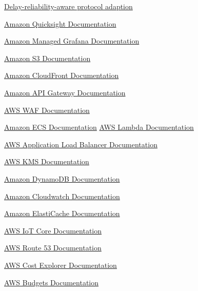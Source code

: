 \documentclass{article}
\begin{document}
\begin{thebibliography}{9}

 \href{https://journals.sagepub.com/doi/10.1177/15501329221097815#}{Delay-reliability-aware protocol adaption}

 \href{https://docs.aws.amazon.com/quicksight//}{Amazon Quicksight Documentation}

\href{https://docs.aws.amazon.com/grafana/}{Amazon Managed Grafana Documentation}

\href{https://docs.aws.amazon.com/s3/}{Amazon S3 Documentation}

 \href{https://docs.aws.amazon.com/cloudfront/}{Amazon CloudFront Documentation}

 \href{https://docs.aws.amazon.com/apigateway/}{Amazon API Gateway Documentation}

\href{https://docs.aws.amazon.com/waf/}{AWS WAF Documentation}

\href{https://docs.aws.amazon.com/ecs/}{Amazon ECS Documentation}
 \href{https://docs.aws.amazon.com/lambda/}{AWS Lambda Documentation}

 \href{https://docs.aws.amazon.com/elasticloadbalancing/latest/application/introduction.html}{AWS Application Load Balancer Documentation}

\href{https://docs.aws.amazon.com/kms/}{AWS KMS Documentation}

\href{https://docs.aws.amazon.com/dynamodb/}{Amazon DynamoDB Documentation}


\href{https://docs.aws.amazon.com/cloudwatch/}{Amazon Cloudwatch Documentation}

 \href{https://docs.aws.amazon.com/elasticache/}{Amazon ElastiCache Documentation}

\href{https://docs.aws.amazon.com/iot-core/}{AWS IoT Core Documentation}

 \href{https://docs.aws.amazon.com/route53/}{AWS Route 53 Documentation}

\href{https://docs.aws.amazon.com/cost-explorer/}{AWS Cost Explorer Documentation}

 \href{https://docs.aws.amazon.com/awsaccountbilling/}{AWS Budgets Documentation}


\end{thebibliography}
\end{document}
